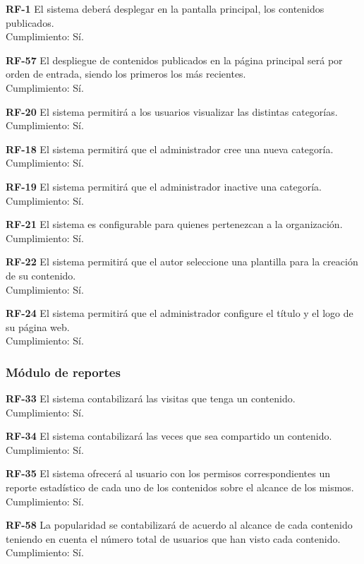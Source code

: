 \documentclass[10pt,times,twocolumn]{article}
\begin{document}
\noindent \textbf{RF-1} El sistema deberá desplegar en la pantalla principal, los contenidos publicados.\\
Cumplimiento: Sí.

\noindent \textbf{RF-57} El despliegue de contenidos publicados en la página principal será por orden de entrada, siendo los primeros los más recientes.\\
Cumplimiento: Sí.

\noindent \textbf{RF-20} El sistema permitirá a los usuarios visualizar las distintas categorías.\\
Cumplimiento: Sí.

\noindent \textbf{RF-18} El sistema permitirá que el administrador cree una nueva categoría.\\
Cumplimiento: Sí.

\noindent \textbf{RF-19} El sistema permitirá que el administrador inactive una categoría.\\
Cumplimiento: Sí.

\noindent \textbf{RF-21} El sistema es configurable para quienes pertenezcan a la organización.\\
Cumplimiento: Sí.

\noindent \textbf{RF-22} El sistema permitirá que el autor seleccione una plantilla para la  creación de su contenido.\\
Cumplimiento: Sí.

\noindent \textbf{RF-24} El sistema permitirá que el administrador configure el título y el logo de su página web.\\
Cumplimiento: Sí.

\subsubsection{Módulo de reportes}

\noindent \textbf{RF-33} El sistema contabilizará las visitas que tenga un contenido.\\
Cumplimiento: Sí.

\noindent \textbf{RF-34} El sistema contabilizará las veces que sea compartido un contenido.\\
Cumplimiento: Sí.

\noindent \textbf{RF-35} El sistema ofrecerá al usuario con los permisos correspondientes un reporte  estadístico de cada uno de los contenidos sobre el alcance de los mismos.\\
Cumplimiento: Sí.

\noindent \textbf{RF-58} La popularidad se contabilizará de acuerdo al alcance de cada contenido  teniendo en cuenta el número total de usuarios que han visto cada contenido.\\
Cumplimiento: Sí.
\end{document}
